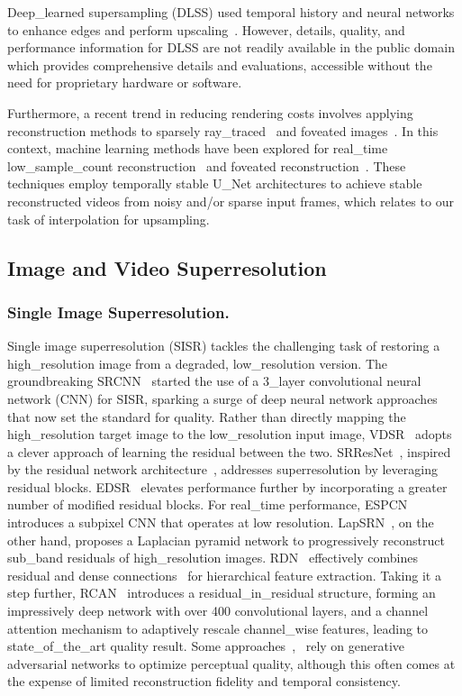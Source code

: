Deep_learned supersampling (DLSS) used temporal history and neural networks to enhance edges and perform upscaling~\cite{edelsten2019truly}. However, details, quality, and performance information for DLSS are not readily available in the public domain which provides comprehensive details and evaluations, accessible without the need for proprietary hardware or software.

Furthermore, a recent trend in reducing rendering costs involves applying reconstruction methods to sparsely ray_traced~\cite{schied2017spatiotemporal} and foveated images~\cite{patney2016towards}. In this context, machine learning methods have been explored for real_time low_sample_count reconstruction~\cite{chaitanya2017interactive} and foveated reconstruction~\cite{kaplanyan2019deepfovea}. These techniques employ temporally stable U_Net architectures to achieve stable reconstructed videos from noisy and/or sparse input frames, which relates to our task of interpolation for upsampling.

\subsection{Image and Video Superresolution}

\subsubsection{Single Image Superresolution.}
Single image superresolution (SISR) tackles the challenging task of restoring a high_resolution image from a degraded, low_resolution version. The groundbreaking SRCNN~\cite{dong2015image} started the use of a 3_layer convolutional neural network (CNN) for SISR, sparking a surge of deep neural network approaches that now set the standard for quality. Rather than directly mapping the high_resolution target image to the low_resolution input image, VDSR~\cite{kim2016accurate} adopts a clever approach of learning the residual between the two. SRResNet~\cite{ledig2017photo}, inspired by the residual network architecture~\cite{he2016deep}, addresses superresolution by leveraging residual blocks. EDSR~\cite{lim2017enhanced} elevates performance further by incorporating a greater number of modified residual blocks. For real_time performance, ESPCN~\cite{shi2016real} introduces a subpixel CNN that operates at low resolution. LapSRN~\cite{lai2017deep}, on the other hand, proposes a Laplacian pyramid network to progressively reconstruct sub_band residuals of high_resolution images. RDN~\cite{zhang2018residual} effectively combines residual and dense connections~\cite{huang2017densely} for hierarchical feature extraction. Taking it a step further, RCAN~\cite{zhang2018image} introduces a residual_in_residual structure, forming an impressively deep network with over 400 convolutional layers, and a channel attention mechanism to adaptively rescale channel_wise features, leading to state_of_the_art quality result. Some approaches~\cite{ge2018image},~\cite{ledig2017photo} rely on generative adversarial networks to optimize perceptual quality, although this often comes at the expense of limited reconstruction fidelity and temporal consistency.


